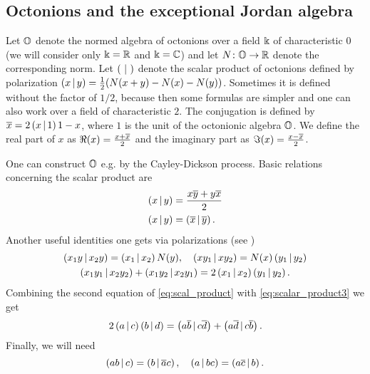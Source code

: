 \subsection{Octonions and the exceptional Jordan algebra}

Let $\mathbb{O}$ denote the normed algebra of octonions over a field $\Bbbk$ of characteristic $0$ (we will consider only $\Bbbk=\mathbb{R}$ and $\Bbbk =\mathbb{C}$) and let $N\colon\mathbb{O} \to \mathbb{R}$ denote the corresponding norm. Let $\left( \, \,|\, \, \right)$ denote the scalar product of octonions  defined by polarization $\left( x \,|\, y \right) = \frac{1}{2} (N(x+y) - N(x) - N(y))$. Sometimes it is defined without the factor of $1/2$, because then some formulas are simpler and one can also work over a field of characteristic $2$. The conjugation is defined by $\overline{x} = 2\left( x \,|\, 1 \right)1 - x$, where $1$ is the unit of the octonionic algebra $\mathbb{O}$. We define the real part of $x$ as $\Re(x) = \frac{x + \overline{x}}{2}$ and the imaginary part as $\Im(x) = \frac{x-\overline{x}}{2}$. 

One can construct $\mathbb{O}$ e.g. by the Cayley-Dickson process. Basic relations concerning the scalar product are 
\begin{equation}\label{eq:scal_product}
\begin{aligned}
\left( x \,|\, y \right) & = \frac{ x\overline{y} + y\overline{x}}{2}\\
\left( x \,|\, y \right) & = \left( \overline{x} \,|\, \overline{y} \right).
\end{aligned}
\end{equation}
Another useful  identities one gets via polarizations (see \cite[p. 5]{springer_octonions_2000})
\begin{gather}
\left( x_1y \,|\, x_2y \right) = \left( x_1 \,|\, x_2 \right) N(y), \quad \left( xy_1 \,|\, xy_2 \right) = N(x)\left( y_1 \,|\, y_2 \right) \label{eq:scalar_product2}\\
\left( x_1y_1 \,|\, x_2y_2 \right) + \left( x_1y_2 \,|\, x_2y_1 \right) = 2\left( x_1 \,|\, x_2 \right)\left( y_1 \,|\, y_2 \right).\label{eq:scalar_product3}
\end{gather}
Combining the second equation of \eqref{eq:scal_product} with \eqref{eq:scalar_product3} we get
\begin{equation}\label{eq:scalar_product4}
2\left( a \,|\, c \right)\left( b \,|\, d \right) = \left( a\overline{b} \,|\, c\overline{d} \right) + \left( a\overline{d} \,|\, c\overline{b} \right).
\end{equation}
Finally, we will need
\begin{equation}\label{eq:scalar_product5}
\left( ab \,|\, c \right) = \left( b \,|\, \overline{a}c \right), \quad \left( a \,|\, bc \right) = \left( a\overline{c} \,|\, b \right).
\end{equation}

